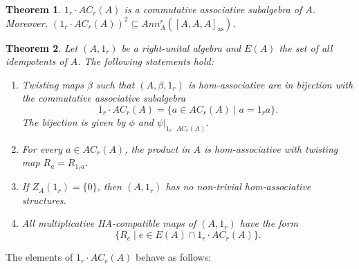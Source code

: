 \documentclass[12pt]{article}
\newtheorem{theorem}{Theorem}
\begin{document}
		\begin{theorem}
			$1_r\cdot AC_r(A)$ is a commutative associative subalgebra of $ A$. Moreover, $\left(1_r\cdot AC_r(A)\right)^2\subseteq Ann_ A ^r([ A, A, A ]_{\mathrm{as}})$.
		\end{theorem}
		
		\begin{theorem}
			Let $(A,1_r)$ be a right-unital algebra and $E(A)$ the set of all idempotents of $ A$. The following statements hold:
			\begin{enumerate}[label=\textnormal{\arabic*)}]
				\item Twisting maps $\beta$ such that $(A,\beta,1_r)$ is hom-associative are in bijection with the commutative associative subalgebra
				\begin{equation}
					1_r\cdot AC_r(A)=\{a\in AC_r(A)\mid  a=1_ra\}.
				\end{equation}
				The bijection is given by $\phi$ and $\psi\vert_{1_r\cdot AC_r(A)}$.
				\item For every $a\in AC_r(A)$, the product in $A$ is hom-associative with twisting map $R_a=R_{1_ra}$.
				\item If $Z_ A (1_r)=\{0\}$, then $(A,1_r)$ has no non-trivial hom-associative structures.
				\item All multiplicative HA-compatible maps of $(A,1_r)$ have the form
				\begin{equation*}
					\{R_e\mid e\in E(A)\cap 1_r\cdot AC_r(A)\}    .
				\end{equation*}
			\end{enumerate}
		\end{theorem}
		The elements of $1_r\cdot AC_r(A)$ behave as follows:
\end{document}
